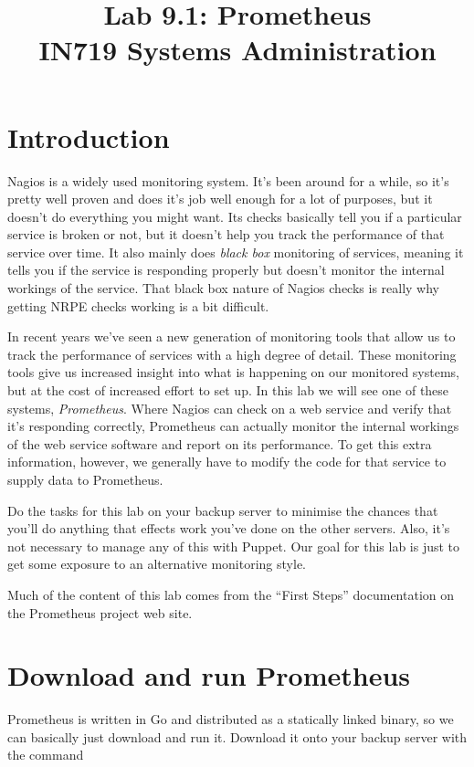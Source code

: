 \documentclass{article}   	%
\title{Lab 9.1:  Prometheus\\ IN719 Systems Administration}
\date{}							%
\begin{document}
\maketitle

\section*{Introduction}
Nagios is a widely used monitoring system. It's been around for a while, so it's pretty well proven and does it's job well enough for a lot of purposes, but it doesn't do everything you might want. Its checks basically tell you if a particular service is broken or not, but it doesn't help you track the performance of that service over time. It also mainly does \emph{black box} monitoring of services, meaning it tells you if the service is responding properly but doesn't monitor the internal workings of the service. That black box nature of Nagios checks is really why getting NRPE checks working is a bit difficult.

In recent years we've seen a new generation of monitoring tools that allow us to track the performance of services with a high degree of detail. These monitoring tools give us increased insight into what is happening on our monitored systems, but at the cost of increased effort to set up. In this lab we will see one of these systems, \emph{Prometheus}. Where Nagios can check on a web service and verify that it's responding correctly, Prometheus can actually monitor the internal workings of the web service software and report on its performance. To get this extra information, however, we generally have to modify the code for that service to supply data to Prometheus.

Do the tasks for this lab on your backup server to minimise the chances that you'll do anything that effects work you've done on the other servers. Also, it's not necessary to manage any of this with Puppet. Our goal for this lab is just to get some exposure to an alternative monitoring style.

Much of the content of this lab comes from the ``First Steps'' documentation on the Prometheus project web site.

\section{Download and run Prometheus}
Prometheus is written in Go and distributed as a statically linked binary, so we can basically just download and run it. Download it onto your backup server with the command
\end{document}
